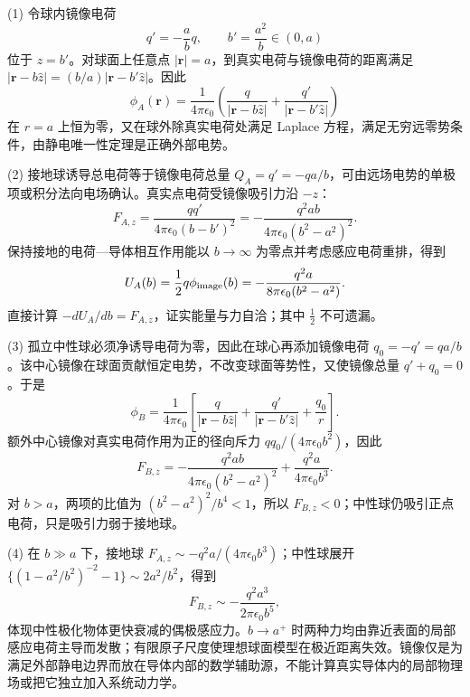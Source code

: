(1) 令球内镜像电荷
\[
q'=-\frac{a}{b}q,\qquad b'=\frac{a^2}{b}\in(0,a)
\]
位于 \(z=b'\)。对球面上任意点 \(|\boldsymbol r|=a\)，到真实电荷与镜像电荷的距离满足 \(|\boldsymbol r-b\hat z|=(b/a)|\boldsymbol r-b'\hat z|\)。因此
\[
\phi_A(\boldsymbol r)=\frac1{4\pi\epsilon_0}
\left(\frac q{|\boldsymbol r-b\hat z|}+\frac{q'}{|\boldsymbol r-b'\hat z|}\right)
\]
在 \(r=a\) 上恒为零，又在球外除真实电荷处满足 Laplace 方程，满足无穷远零势条件，由静电唯一性定理是正确外部电势。

(2) 接地球诱导总电荷等于镜像电荷总量 \(Q_A=q'=-qa/b\)，可由远场电势的单极项或积分法向电场确认。真实点电荷受镜像吸引力沿 \(-z\)：
\[
F_{A,z}=\frac{qq'}{4\pi\epsilon_0(b-b')^2}
=-\frac{q^2ab}{4\pi\epsilon_0(b^2-a^2)^2}.
\]
保持接地的电荷—导体相互作用能以 \(b\to\infty\) 为零点并考虑感应电荷重排，得到
\[
U_A(b)=\frac12q\phi_{\rm image}(b)
=-\frac{q^2a}{8\pi\epsilon_0(b^2-a^2)}.
\]
直接计算 \(-dU_A/db=F_{A,z}\)，证实能量与力自洽；其中 \(\tfrac12\) 不可遗漏。

(3) 孤立中性球必须净诱导电荷为零，因此在球心再添加镜像电荷 \(q_0=-q'=qa/b\)。该中心镜像在球面贡献恒定电势，不改变球面等势性，又使镜像总量 \(q'+q_0=0\)。于是
\[
\phi_B=\frac1{4\pi\epsilon_0}
\left[\frac q{|\boldsymbol r-b\hat z|}+\frac{q'}{|\boldsymbol r-b'\hat z|}+\frac{q_0}{r}\right].
\]
额外中心镜像对真实电荷作用为正的径向斥力 \(qq_0/(4\pi\epsilon_0b^2)\)，因此
\[
F_{B,z}=-\frac{q^2ab}{4\pi\epsilon_0(b^2-a^2)^2}
+\frac{q^2a}{4\pi\epsilon_0b^3}.
\]
对 \(b>a\)，两项的比值为 \((b^2-a^2)^2/b^4<1\)，所以 \(F_{B,z}<0\)；中性球仍吸引正点电荷，只是吸引力弱于接地球。

(4) 在 \(b\gg a\) 下，接地球 \(F_{A,z}\sim-q^2a/(4\pi\epsilon_0b^3)\)；中性球展开 \(\{(1-a^2/b^2)^{-2}-1\}\sim 2a^2/b^2\)，得到
\[
F_{B,z}\sim-\frac{q^2a^3}{2\pi\epsilon_0b^5},
\]
体现中性极化物体更快衰减的偶极感应力。\(b\to a^+\) 时两种力均由靠近表面的局部感应电荷主导而发散；有限原子尺度使理想球面模型在极近距离失效。镜像仅是为满足外部静电边界而放在导体内部的数学辅助源，不能计算真实导体内的局部物理场或把它独立加入系统动力学。
